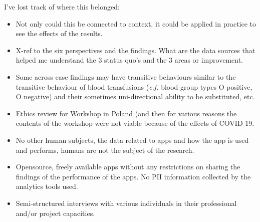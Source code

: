 
I've lost track of where this belonged:
\begin{itemize}
    \item Not only could this be connected to context, it could be applied in practice to see the effects of the results.
    \item X-ref to the six perspectives and the findings. What are the data sources that helped me understand the 3 status quo's and the 3 areas or improvement.
    \item Some across case findings may have transitive behaviours similar to the transitive behaviour of blood transfusions (\textit{c.f.} blood group types O positive, O negative) and their sometimes uni-directional ability to be substituted, etc.
\end{itemize}


\begin{itemize}
    \item Ethics review for Workshop in Poland (and then for various reasons the contents of the workshop were not viable because of the effects of COVID-19.
    \item No other human subjects, the data related to apps and how the app is used and performs, humans are not the subject of the research.
    \item Opensource, freely available apps without any restrictions on sharing the findings of the performance of the apps. No PII information collected by the analytics tools used.
    \item Semi-structured interviews with various individuals in their professional and/or project capacities.
\end{itemize}




% 

